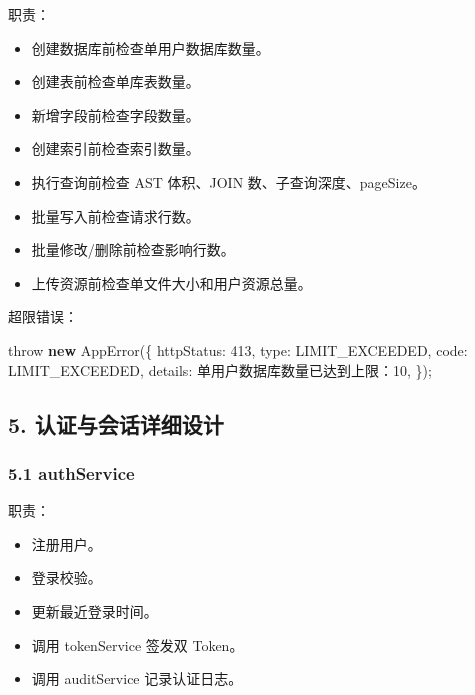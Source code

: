 \documentclass[
  a4paper,
  UTF8]{ctexart}
\newenvironment{Shaded}{}{}
\newcommand{\DecValTok}[1]{\textcolor[rgb]{0.25,0.63,0.44}{#1}}
\newcommand{\FunctionTok}[1]{\textcolor[rgb]{0.02,0.16,0.49}{#1}}
\newcommand{\KeywordTok}[1]{\textcolor[rgb]{0.00,0.44,0.13}{\textbf{#1}}}
\newcommand{\NormalTok}[1]{#1}
\newcommand{\OperatorTok}[1]{\textcolor[rgb]{0.40,0.40,0.40}{#1}}
\newcommand{\StringTok}[1]{\textcolor[rgb]{0.25,0.44,0.63}{#1}}
\providecommand{\tightlist}{%
  \setlength{\itemsep}{0pt}\setlength{\parskip}{0pt}}
\begin{document}
职责：

\begin{itemize}
\tightlist
\item
  创建数据库前检查单用户数据库数量。
\item
  创建表前检查单库表数量。
\item
  新增字段前检查字段数量。
\item
  创建索引前检查索引数量。
\item
  执行查询前检查 AST 体积、JOIN 数、子查询深度、pageSize。
\item
  批量写入前检查请求行数。
\item
  批量修改/删除前检查影响行数。
\item
  上传资源前检查单文件大小和用户资源总量。
\end{itemize}

超限错误：

\begin{Shaded}
\begin{Highlighting}[]
\NormalTok{throw }\KeywordTok{new} \FunctionTok{AppError}\NormalTok{(\{}
\NormalTok{  httpStatus}\OperatorTok{:} \DecValTok{413}\OperatorTok{,}
\NormalTok{  type}\OperatorTok{:} \StringTok{\textquotesingle{}LIMIT\_EXCEEDED\textquotesingle{}}\OperatorTok{,}
\NormalTok{  code}\OperatorTok{:} \StringTok{\textquotesingle{}LIMIT\_EXCEEDED\textquotesingle{}}\OperatorTok{,}
\NormalTok{  details}\OperatorTok{:} \StringTok{\textquotesingle{}单用户数据库数量已达到上限：10\textquotesingle{}}\OperatorTok{,}
\NormalTok{\})}\OperatorTok{;}
\end{Highlighting}
\end{Shaded}

\hypertarget{ux8ba4ux8bc1ux4e0eux4f1aux8bddux8be6ux7ec6ux8bbeux8ba1}{%
\subsection{5.
认证与会话详细设计}\label{ux8ba4ux8bc1ux4e0eux4f1aux8bddux8be6ux7ec6ux8bbeux8ba1}}

\hypertarget{authservice}{%
\subsubsection{5.1 authService}\label{authservice}}

职责：

\begin{itemize}
\tightlist
\item
  注册用户。
\item
  登录校验。
\item
  更新最近登录时间。
\item
  调用 tokenService 签发双 Token。
\item
  调用 auditService 记录认证日志。
\end{itemize}
\end{document}
